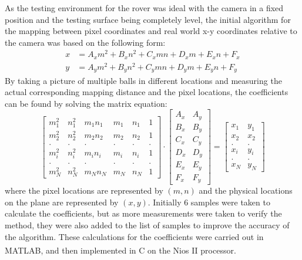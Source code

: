 \documentclass[a4paper]{article}
\begin{document}

As the testing environment for the rover was ideal with the camera in a fixed 
position and the testing surface being completely level, the initial algorithm 
for the mapping between pixel coordinates and real world x-y coordinates relative
to the camera was based on the following form: \begin{align*}
    x & = A_x m^2 + B_x n^2 + C_x mn + D_x m + E_x n + F_x \\
    y & = A_y m^2 + B_y n^2 + C_y mn + D_y m + E_y n + F_y  
\end{align*} By taking a picture of multiple balls in different locations and 
measuring the actual corresponding mapping distance and the pixel locations, the
coefficients can be found by solving the matrix equation: $$
    \begin{bmatrix}
        m^2_1 & n^2_1 & m_1n_1 & m_1 & n_1 & 1 \\
        m^2_2 & n^2_2 & m_2n_2 & m_2 & n_2 & 1 \\
        .     & .     &    .   &  .  & .   & . \\
        m^2_i & n^2_i & m_in_i & m_i & n_i & 1 \\  
        .     & .     &    .   &  .  & .   & . \\
        m^2_N & n^2_N & m_Nn_N & m_N & n_N & 1  
    \end{bmatrix}
    \cdot
    \begin{bmatrix}
        A_x & A_y \\
        B_x & B_y \\
        C_x & C_y \\
        D_x & D_y \\
        E_x & E_y \\
        F_x & F_y
    \end{bmatrix}
    =
    \begin{bmatrix}
        x_1 & y_1 \\
        x_2 & x_2 \\
        . & . \\
        x_i & y_i \\
        . & . \\
        x_N & y_N
    \end{bmatrix}
$$ where the pixel locations are represented by \((m,n)\) and the physical locations on
the plane are represented by \((x,y)\). Initially 6 samples were taken to calculate 
the coefficients, but as more measurements were taken to verify the method, they
were also added to the list of samples to improve the accuracy of the algorithm.
These calculations for the coefficients were carried out in MATLAB, and then 
implemented in C on the Nios\textsuperscript{\textregistered} II processor. 
\end{document}
